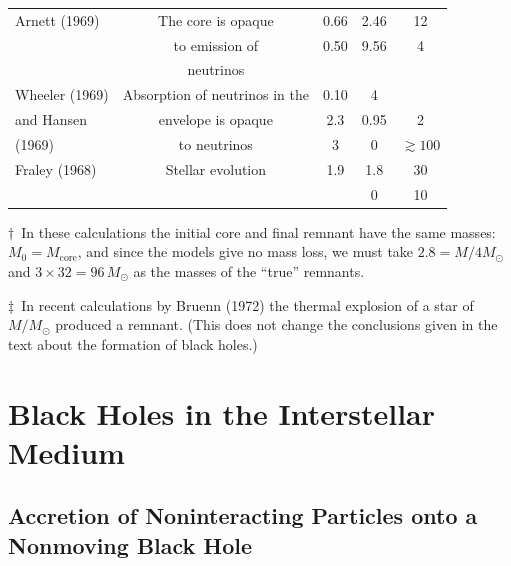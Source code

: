 \begin{table}[htbp]
\begin{tabular}{l c c c c}
Arnett (1969) & The core is opaque & 0.66 & 2.46 & 12 \\
& to emission of & 0.50 & 9.56 & 4 \\
& neutrinos & & & \\[3pt]
Wheeler (1969) & Absorption of neutrinos in the & 0.10 & 4 & \\
and Hansen & envelope is opaque & 2.3 & 0.95 & 2 \\[3pt]
(1969) & to neutrinos & 3 & 0 & $\gtrsim 100$ \\[3pt]
Fraley (1968) & Stellar evolution & 1.9 & 1.8 & 30 \\
& & & 0 & 10 \\
\hline\hline
\end{tabular}

\smallskip
\noindent
$\dagger$~In these calculations the initial core and final remnant have the same masses: $M_0 = M_\text{core}$, and since the models give no mass loss, we must
take $2.8 = M/4M_\odot$ and $3 \times 32 = 96 \, M_\odot$ as the masses of the ``true'' remnants.

\noindent
$\ddagger$~In recent calculations by Bruenn (1972) the thermal explosion of a star of $M/M_\odot$ produced a remnant. (This does not change the conclusions given in the text about the formation of black holes.)
\end{table}



\section{Black Holes in the Interstellar Medium}
\label{sec:4}

\subsection{Accretion of Noninteracting Particles onto a Nonmoving Black Hole}
\label{sec:4.1}

